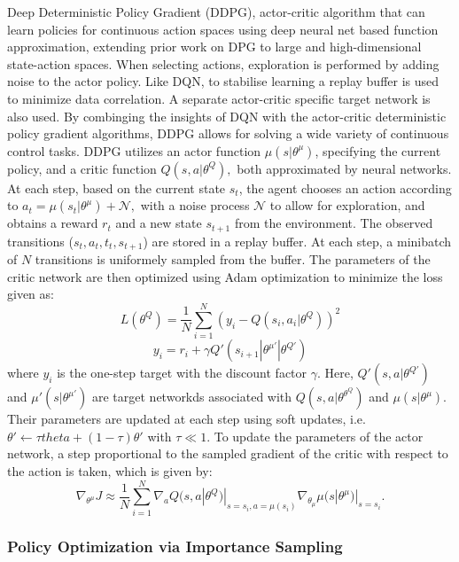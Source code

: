 Deep Deterministic Policy Gradient (DDPG), actor-critic algorithm that can learn policies for
continuous action spaces using deep neural net based function
approximation, extending prior work on DPG to large and
high-dimensional state-action spaces. When selecting actions,
exploration is performed by adding noise to the actor policy.
Like DQN, to stabilise learning a replay buffer is used to
minimize data correlation. A separate actor-critic specific
target network is also used.
By combinging the insights of DQN with the actor-critic deterministic policy gradient algorithms, DDPG allows for solving a wide variety of continuous control tasks. DDPG utilizes an actor function $\mu(s|\theta^\mu)$, specifying the current policy, and a critic function $Q(s,a|\theta^Q),$ both approximated by neural networks. At each step, based on the current state $s_t$, the agent chooses an action according to $a_t=\mu(s_t|\theta^\mu) + \mathcal{N},$ with a noise process $\mathcal{N}$ to allow for exploration, and obtains a reward $r_t$ and a new state $s_{t+1}$ from the environment. The observed transitions ($s_t,a_t,t_t,s_{t+1}$) are stored in a replay buffer. At each step, a minibatch of $N$ transitions is uniformely sampled from the buffer. The parameters of the critic network are then optimized using Adam optimization to minimize the loss given as: \[L(\theta^Q) = \frac{1}{N}\sum^N_{i=1}(y_i-Q(s_i,a_i|\theta^Q))^2\]
\[y_i=r_i+\gamma Q'(s_{i+1}|\theta^{\mu'}|\theta^{Q'})\]
where $y_i$ is the one-step target with the discount factor $\gamma$. Here, $Q'(s,a|\theta^{Q'})$ and $\mu'(s|\theta^{\mu'})$ are target networkds associated with $Q(s,a|\theta^{\theta^Q})$ and $\mu(s|\theta^\mu).$ Their parameters are updated at each step using soft updates, i.e. \(\theta' \leftarrow \tau theta + (1-\tau)\theta'\) with $\tau \ll 1.$ To update the parameters of the actor network, a step proportional to the sampled gradient of the critic with respect to the action is taken, which is given by: \[\nabla_{\theta^\mu}J\approx\frac{1}{N}\sum^N_{i=1}\nabla_aQ(s,a|\theta^Q)|_{s=s_i,a=\mu(s_i)}\nabla_{\theta_\mu}\mu(s|\theta^\mu)|_{s=s_i}.\]

\subsubsection{Policy Optimization via Importance Sampling}

